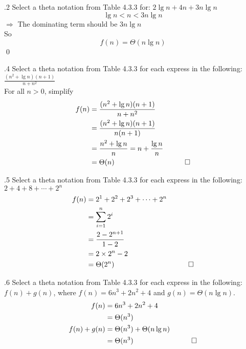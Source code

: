 \documentclass[
               handout,
               ]{beamer}
\begin{document}
        \begin{frame}[c]{\subsecname.2}
            Select a theta notation from Table 4.3.3 for: $2\lg{n}+4n+3n\lg{n}$\\$\;$\\\pause
            \[\lg n<n<3n\lg n\]
            $\Rightarrow$ The dominating term should be $3n\lg{n}$\\
            So\[f(n)=\Theta(n\lg{n})\] \qed
        \end{frame}
    
        \begin{frame}[c]{\subsecname.4}
            Select a theta notation from Table 4.3.3 for each express in the following:$\frac{(n^2+\lg{n})(n+1)}{n+n^2}$\\$\;$\\\pause
            For all $n > 0$, simplify\\
            \begin{align*}
            f(n)&=\frac{(n^2+\lg{n})(n+1)}{n+n^2}\\
            &=\frac{(n^2+\lg{n})(n+1)}{n(n+1)}\\
            &=\frac{n^2+\lg{n}}{n}=n+\frac{\lg{n}}{n}\\
            &=\Theta(n) &\qed
            \end{align*}
        \end{frame}
    
        \begin{frame}[c]{\subsecname.5}
            Select a theta notation from Table 4.3.3 for each express in the following:$2+4+8+\cdots+2^n$\\\pause
            \begin{align*}
            f(n)&=2^1+2^2+2^3+\cdots+2^n\\
            &=\sum_{i=1}^{n}2^i\\
            &=\frac{2-2^{n+1}}{1-2}\\
            &=2\times2^n-2\\
            &=\Theta(2^n) &\qed
            \end{align*}
        \end{frame}
    
        \begin{frame}[c]{\subsecname.6}
            Select a theta notation from Table 4.3.3 for each express in the following:$f(n)+g(n)$, where $f(n)=6n^3+2n^2+4$ and $g(n)=\Theta(n\lg{n})$.\\\pause
            \begin{align*}
            f(n)&=6n^3+2n^2+4\\
            &=\Theta(n^3)\\
            f(n)+g(n)&=\Theta(n^3)+\Theta(n\lg{n})\\
            &=\Theta(n^3) &\qed
            \end{align*}
        \end{frame}
\end{document}
